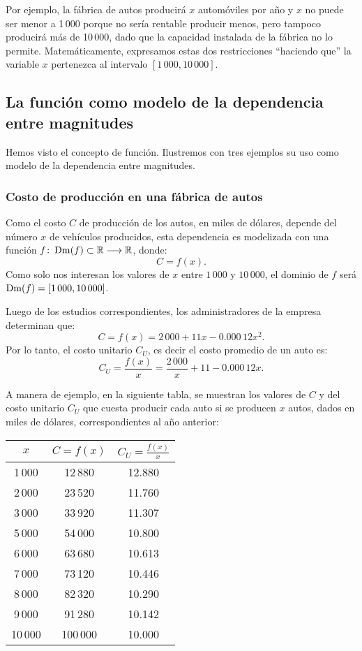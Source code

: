Por ejemplo, la fábrica de autos producirá $x$ automóviles por año y $x$ no puede ser menor a
1\,000 porque no sería rentable producir menos, pero tampoco producirá más de 10\,000, dado que la
capacidad instalada de la fábrica no lo permite. Matemáticamente, expresamos estas dos
restricciones ``haciendo que'' la variable $x$ pertenezca al intervalo $[1\,000,10\,000]$.

\subsection{La función como modelo de la dependencia entre magnitudes}
Hemos visto el concepto de función. Ilustremos con tres ejemplos su uso como modelo de la
dependencia entre magnitudes.

\subsubsection{Costo de producción en una fábrica de autos}
Como el costo $C$ de producción de los autos, en miles de dólares, depende del número $x$ de
vehículos producidos, esta dependencia es modelizada con una función
$f\colon \operatorname{Dm}(f)\subset\mathbb{R}\longrightarrow \mathbb{R}$, donde:
\[
C=f(x).
\]
Como solo nos interesan los valores de $x$ entre $1\,000$ y $10\,000$, el dominio de $f$ será
$\operatorname{Dm}(f)=[1\,000,10\,000]$.

Luego de los estudios correspondientes, los administradores de la empresa determinan que:
\[
C=f(x)=2\,000+11x -0.000\,12x^{2}.
\]
Por lo tanto, el costo unitario $C_U$, es decir el costo promedio de un auto es:
\[
C_U = \frac{f(x)}{x}=\frac{2\,000}{x}+11-0.000\,12x.
\]

A manera de ejemplo, en la siguiente tabla, se muestran los valores de $C$ y del costo unitario
$C_U$ que cuesta producir cada auto si se producen $x$ autos, dados en miles de dólares,
correspondientes al año anterior:

\begingroup
\begin{center}
{\renewcommand\arraystretch{1.5}%
\setlength\extrarowheight{1pt}
\begin{tabular}{|c |c |c|}
\hline
$x$ & $C=f(x)$ & $C_U=\frac{f(x)}{x}$  \\
\hline
1\,000  &  12\,880 &  12.880 \\[-2pt]
\hline
2\,000 & 23\,520 & 11.760 \\
\hline
3\,000 & 33\,920  & 11.307 \\
\hline
5\,000 & 54\,000 & 10.800 \\
\hline
6\,000 & 63\,680 & 10.613 \\
\hline
7\,000 & 73\,120 & 10.446 \\
\hline
8\,000 & 82\,320 & 10.290 \\
\hline
9\,000 & 91\,280 & 10.142 \\
\hline
10\,000 & 100\,000 & 10.000 \\
\hline
\end{tabular}}
\end{center}


